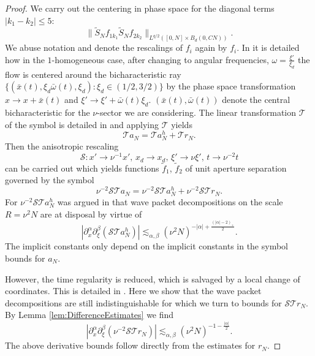 \documentclass{amsart}
\numberwithin{equation}{section}
\theoremstyle{definition}
\begin{document}
\begin{proof}
We carry out the centering in phase space for the diagonal terms $|k_1-k_2| \leq 5$:
\begin{equation*}
    \| \tilde{S}_N f_{1 k_1} \tilde{S}_N f_{2 k_2} \|_{L^{q/2}([0,N]\times B_d(0,CN))}.
\end{equation*}
We abuse notation and denote the rescalings of $f_i$ again by $f_i$. In \cite[Subsection~5.3.2]{SchippaTataru2025} it is detailed how in the $1$-homogeneous case, after changing to angular frequencies, $\omega = \frac{\xi'}{\xi_d}$ the flow is centered around the bicharacteristic ray $\{ (\bar{x}(t),\xi_d \bar{\omega}(t),\xi_d) : \xi_d \in (1/2,3/2) \}$ by the phase space transformation $x \to x+ \bar{x}(t)$ and $\xi' \to \xi' + \bar{\omega}(t) \xi_d$. $(\bar{x}(t),\bar{\omega}(t))$ denote the central bicharacteristic for the $\nu$-sector we are considering. The linear transformation $\mathcal{T}$ of the symbol is detailed in \cite[Subsection~5.3.2]{SchippaTataru2025} and applying $\mathcal{T}$ yields 
\begin{equation*}
\mathcal{T} a_N = \mathcal{T} a_N^h + \mathcal{T} r_N.
\end{equation*}
Then the anisotropic rescaling 
\begin{equation*}
\mathcal{S}: x' \to \nu^{-1} x',\, x_d \to x_d, \, \xi' \to \nu \xi', \, t \to \nu^{-2} t
\end{equation*}
can be carried out which yields functions $\tilde{f}_1$, $\tilde{f}_2$ of unit aperture separation governed by the symbol
\begin{equation*}
\nu^{-2} \mathcal{S} \mathcal{T} a_N = \nu^{-2} \mathcal{S} \mathcal{T} a_N^h + \nu^{-2} \mathcal{S} \mathcal{T} r_N.
\end{equation*}
For $\nu^{-2} \mathcal{S} \mathcal{T} a_N^h$ was argued in \cite{SchippaTataru2025} that wave packet decompositions on the scale $R = \nu^{2} N$ are at disposal by virtue of
\begin{equation*}
|\partial_x^{\alpha} \partial_{\xi}^{\beta} (\mathcal{S} \mathcal{T} a_N^h) | \lesssim_{\alpha,\beta} (\nu^{2} N)^{-|\alpha|+  \frac{(|\alpha|-2)_+}{2}}.
\end{equation*}
The implicit constants only depend on the implicit constants in the symbol bounds for $a_N$.

However, the time regularity is reduced, which is salvaged by a local change of coordinates. This is detailed in \cite[Section~5.3.2]{SchippaTataru2025}. Here we show that the wave packet decompositions are still indistinguishable for which we turn to bounds for $\mathcal{S} \mathcal{T} r_N$. By Lemma \ref{lem:DifferenceEstimates} we find
\begin{equation*}
|\partial_{x}^{\alpha} \partial_{\xi}^{\beta} (\nu^{-2} \mathcal{S} \mathcal{T} r_N) | \lesssim_{\alpha,\beta} (\nu^2 N)^{-1 - \frac{|\alpha|}{2}}.
\end{equation*}
The above derivative bounds follow directly from the estimates for $r_N$.


\end{proof}
\end{document}

